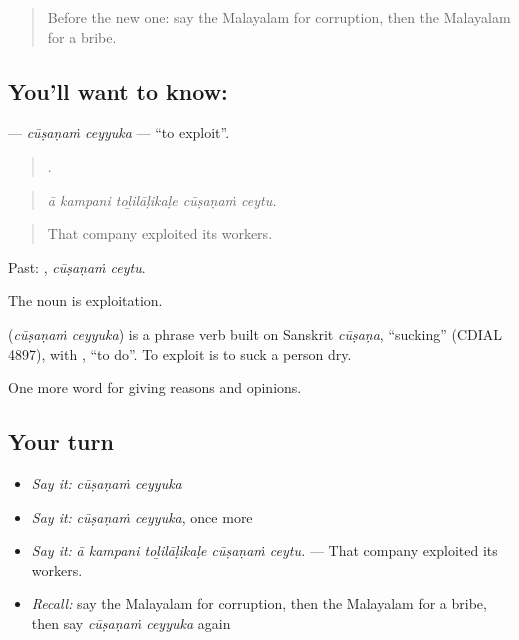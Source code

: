 \label{lesson:ML-C430-cusanam-ceyyuka}



\begin{quote}
Before the new one: say the Malayalam for corruption, then the Malayalam for a bribe.
\end{quote}

\subsection*{You'll want to know:  }
\textbf{ } — \emph{cūṣaṇaṁ ceyyuka} — \textquotedblleft{}to exploit\textquotedblright{}.

\begin{quote}
    .
\end{quote}

\begin{quote}
\emph{ā kampani toḻilāḷikaḷe cūṣaṇaṁ ceytu.}
\end{quote}

\begin{quote}
That company exploited its workers.
\end{quote}

Past:  , \emph{cūṣaṇaṁ ceytu}.

The noun  is exploitation.

\begin{cousinweb}
\textbf{ } (\emph{cūṣaṇaṁ ceyyuka}) is a phrase verb built on Sanskrit \emph{cūṣaṇa}, \textquotedblleft{}sucking\textquotedblright{} (CDIAL 4897), with , \textquotedblleft{}to do\textquotedblright{}. To exploit is to suck a person dry.
\end{cousinweb}

\begin{grammarlens}[title={What you've built}]
One more word for giving reasons and opinions.
\end{grammarlens}

\subsection*{Your turn}
\begin{itemize}
\raggedright
  \item \emph{Say it:} \emph{cūṣaṇaṁ ceyyuka}
  \item \emph{Say it:} \emph{cūṣaṇaṁ ceyyuka}, once more
  \item \emph{Say it:} \emph{ā kampani toḻilāḷikaḷe cūṣaṇaṁ ceytu.} — That company exploited its workers.
  \item \emph{Recall:} say the Malayalam for corruption, then the Malayalam for a bribe, then say \emph{cūṣaṇaṁ ceyyuka} again
\end{itemize}

